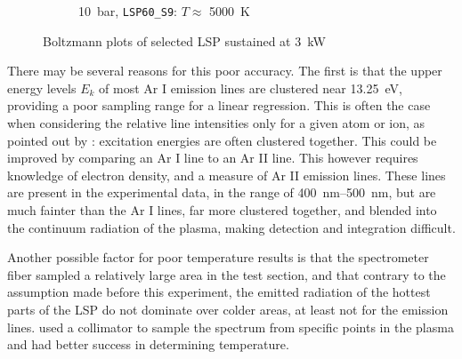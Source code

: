\begin{figure}[h]
\begin{subfigure}[t]{0.47\textwidth}
                    \caption{\qty{10}{bar}, \texttt{LSP60\_S9}: $T \approx$ \qty{5000}{K}}
                    \label{fig:boltzmann_LSP60_S9}
                \end{subfigure}
                \caption{Boltzmann plots of selected LSP sustained at \qty{3}{kW}}
                \label{fig:boltzmannplot}
            \end{figure}

            There may be several reasons for this poor accuracy. The first is that the upper energy levels $E_k$ of most Ar I emission lines are clustered near \qty{13.25}{eV}, providing a poor sampling range for a linear regression. This is often the case when considering the relative line intensities only for a given atom or ion, as pointed out by \textcite{griemSpectroscopicTemperatureMeasurements1997}: excitation energies are often clustered together. This could be improved 
            by comparing an Ar I line to an Ar II line. This however requires knowledge of electron density, and a measure of Ar II emission lines. These lines are present in the experimental data, in the range of \qtyrange{400}{500}{nm}, but are much fainter than the Ar I lines, far more clustered together, and blended into the continuum radiation of the plasma, making detection and integration difficult.

            Another possible factor for poor temperature results is that the spectrometer fiber sampled a relatively large area in the test section, and that contrary to the assumption made before this experiment, the emitted radiation of the hottest parts of the LSP do not dominate over colder areas, at least not for the emission lines.  \textcite{nassarInvestigationLasersustainedPlasma2012} used a collimator to sample the spectrum from specific points in the plasma and had better success in determining temperature. 
    
